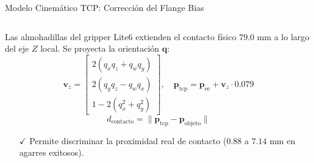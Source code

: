 \begin{frame}{Modelo Cinemático TCP: Corrección del Flange Bias}
  \vspace{0.8mm}
  \begin{columns}[T, onlytextwidth]
    \begin{column}{0.485\textwidth}
      \begin{tcolorbox}[
        enhanced,
        colback=WhiteBg,
        colframe=UCNBlue,
        arc=\CardArc,
        boxrule=\CardRule,
        height=\CardHeightDouble,
        title={\CardTitleFont Proyección Cinemática del Tool Center Point},
        colbacktitle=UCNBlue,
        coltitle=WhiteBg,
        top=1.2mm, bottom=1.2mm, left=1.8mm, right=1.8mm
      ]
        {\BodyFont
        Las almohadillas del gripper Lite6 extienden el contacto físico $79.0\text{ mm}$ a lo largo del eje $Z$ local. Se proyecta la orientación $\mathbf{q}$:
        \begin{equation*}
          \mathbf{v}_z = \begin{bmatrix} 2(q_x q_z + q_w q_y) \\ 2(q_y q_z - q_w q_x) \\ 1 - 2(q_x^2 + q_y^2) \end{bmatrix}, \quad \mathbf{p}_{\text{tcp}} = \mathbf{p}_{\text{ee}} + \mathbf{v}_z \cdot 0.079
        \end{equation*}
        \begin{equation*}
          d_{\text{contacto}} = \|\mathbf{p}_{\text{tcp}} - \mathbf{p}_{\text{objeto}}\|
        \end{equation*}
        \vspace{0.3mm}
        \begin{itemize}\setlength{\itemsep}{1.2pt}
          \item[\textcolor{AgriGreen}{\textbf{$\checkmark$}}] Permite discriminar la proximidad real de contacto ($0.88$ a $7.14\text{ mm}$ en agarres exitosos).
        \end{itemize}}
      \end{tcolorbox}
    \end{column}


\end{columns}
\end{frame}
